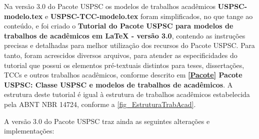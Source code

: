Na vers\~ao 3.0 do Pacote USPSC os modelos de trabalhos acad\^emicos \textbf{USPSC-modelo.tex} e \textbf{USPSC-TCC-modelo.tex} foram simplificados, no que tange ao conte\'udo, e foi criado o \textbf{Tutorial do Pacote USPSC para modelos de trabalhos de acad\^emicos em LaTeX - vers\~ao 3.0}, contendo as instru\c{c}\~oes precisas e detalhadas para melhor utiliza\c{c}\~ao dos recursos do Pacote USPSC. Para tanto, foram acrescidos diversos arquivos, para atender as especificidades do tutorial que possui os elementos pr\'e-textuais distintos para teses, disserta\c{c}\~oes, TCCs e outros trabalhos acad\^emicos, conforme descrito em  \textbf{\ref{Pacote} Pacote USPSC: Classe USPSC e modelos de trabalhos de acad\^emicos}. A estrutura deste tutorial \'e igual \`a  estrutura de trabalhos acad\^emicos estabelecida pela ABNT NBR 14724, conforme a \autoref{fig_EstruturaTrabAcad}.		

A vers\~ao 3.0 do Pacote USPSC traz ainda as seguintes altera\c{c}\~oes e implementa\c{c}\~oes:

